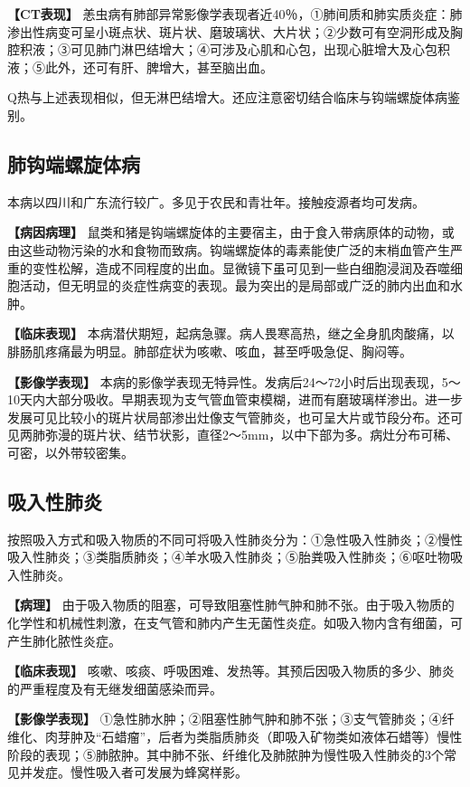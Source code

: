 \textbf{【CT表现】}
恙虫病有肺部异常影像学表现者近40％，①肺间质和肺实质炎症：肺渗出性病变可呈小斑点状、斑片状、磨玻璃状、大片状；②少数可有空洞形成及胸腔积液；③可见肺门淋巴结增大；④可涉及心肌和心包，出现心脏增大及心包积液；⑤此外，还可有肝、脾增大，甚至脑出血。

Q热与上述表现相似，但无淋巴结增大。还应注意密切结合临床与钩端螺旋体病鉴别。

\subsection{肺钩端螺旋体病}

本病以四川和广东流行较广。多见于农民和青壮年。接触疫源者均可发病。

\textbf{【病因病理】}
鼠类和猪是钩端螺旋体的主要宿主，由于食入带病原体的动物，或由这些动物污染的水和食物而致病。钩端螺旋体的毒素能使广泛的末梢血管产生严重的变性松解，造成不同程度的出血。显微镜下虽可见到一些白细胞浸润及吞噬细胞活动，但无明显的炎症性病变的表现。最为突出的是局部或广泛的肺内出血和水肿。

\textbf{【临床表现】}
本病潜伏期短，起病急骤。病人畏寒高热，继之全身肌肉酸痛，以腓肠肌疼痛最为明显。肺部症状为咳嗽、咳血，甚至呼吸急促、胸闷等。

\textbf{【影像学表现】}
本病的影像学表现无特异性。发病后24～72小时后出现表现，5～10天内大部分吸收。早期表现为支气管血管束模糊，进而有磨玻璃样渗出。进一步发展可见比较小的斑片状局部渗出灶像支气管肺炎，也可呈大片或节段分布。还可见两肺弥漫的斑片状、结节状影，直径2～5mm，以中下部为多。病灶分布可稀、可密，以外带较密集。

\subsection{吸入性肺炎}

按照吸入方式和吸入物质的不同可将吸入性肺炎分为：①急性吸入性肺炎；②慢性吸入性肺炎；③类脂质肺炎；④羊水吸入性肺炎；⑤胎粪吸入性肺炎；⑥呕吐物吸入性肺炎。

\textbf{【病理】}
由于吸入物质的阻塞，可导致阻塞性肺气肿和肺不张。由于吸入物质的化学性和机械性刺激，在支气管和肺内产生无菌性炎症。如吸入物内含有细菌，可产生肺化脓性炎症。

\textbf{【临床表现】}
咳嗽、咳痰、呼吸困难、发热等。其预后因吸入物质的多少、肺炎的严重程度及有无继发细菌感染而异。

\textbf{【影像学表现】}
①急性肺水肿；②阻塞性肺气肿和肺不张；③支气管肺炎；④纤维化、肉芽肿及“石蜡瘤”，后者为类脂质肺炎（即吸入矿物类如液体石蜡等）慢性阶段的表现；⑤肺脓肿。其中肺不张、纤维化及肺脓肿为慢性吸入性肺炎的3个常见并发症。慢性吸入者可发展为蜂窝样影。


